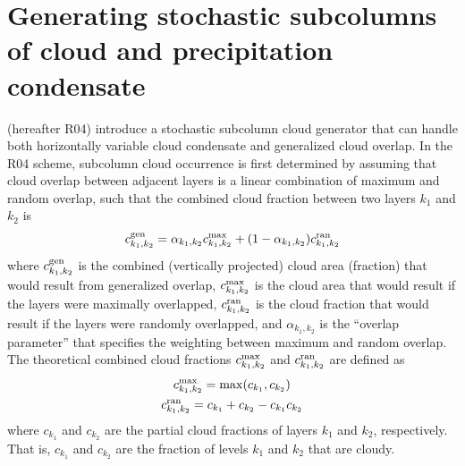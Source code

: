 \section{Generating stochastic subcolumns of cloud and precipitation condensate}
\label{subgrid2_generator_section}
\cite{raisanen_et_al_2004} (hereafter R04) introduce a stochastic subcolumn cloud generator that can handle both horizontally variable cloud condensate and generalized cloud overlap. In the R04 scheme, subcolumn cloud occurrence is first determined by assuming that cloud overlap between adjacent layers is a linear combination of maximum and random overlap, such that the combined cloud fraction between two layers $k_1$ and $k_2$ is
\begin{gather}
c_{k_1, k_2}^{\rm gen} = \alpha_{k_1, k_2} c_{k_1, k_2}^{\rm max} + (1 - \alpha_{k_1, k_2})
c_{k_1, k_2}^{\rm ran}
    \label{generalized_overlap_equation}
\end{gather}
where $c_{k_1, k_2}^{\rm gen}$ is the combined (vertically projected) cloud area (fraction) that would result from generalized overlap, $c_{k_1, k_2}^{\rm max}$ is the cloud area that would result if the layers were maximally overlapped, $c_{k_1, k_2}^{\rm ran}$ is the cloud fraction that would result if the layers were randomly overlapped, and $\alpha_{k_1, k_2}$ is the ``overlap parameter'' that specifies the weighting between maximum and random overlap. The theoretical combined cloud fractions $c^{\rm max}_{k_1, k_2}$ and $c^{\rm ran}_{k_1, k_2}$ are defined as
\begin{gather}
    c^{\rm max}_{k_1, k_2} = \max(c_{k_1}, c_{k_2}) \\
    c^{\rm ran}_{k_1, k_2} = c_{k_1} + c_{k_2} - c_{k_1} c_{k_2}
\end{gather}
where $c_{k_1}$ and $c_{k_2}$ are the partial cloud fractions of layers $k_1$ and $k_2$, respectively. That is, $c_{k_1}$ and $c_{k_2}$ are the fraction of levels $k_1$ and $k_2$ that are cloudy.

